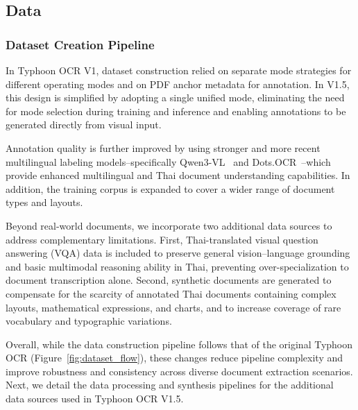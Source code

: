 \documentclass[]{typhoon} %
\begin{document}


\subsection{Data}
\subsubsection{Dataset Creation Pipeline}

In Typhoon OCR V1, dataset construction relied on separate mode strategies for different operating modes and on PDF anchor metadata for annotation. In V1.5, this design is simplified by adopting a single unified mode, eliminating the need for mode selection during training and inference and enabling annotations to be generated directly from visual input.

Annotation quality is further improved by using stronger and more recent multilingual labeling models--specifically Qwen3-VL~\citep{bai2025qwen3vltechnicalreport} and Dots.OCR~\citep{li2025dotsocrmultilingualdocumentlayout}--which provide enhanced multilingual and Thai document understanding capabilities. In addition, the training corpus is expanded to cover a wider range of document types and layouts.

Beyond real-world documents, we incorporate two additional data sources to address complementary limitations. First, Thai-translated visual question answering (VQA) data is included to preserve general vision--language grounding and basic multimodal reasoning ability in Thai, preventing over-specialization to document transcription alone. Second, synthetic documents are generated to compensate for the scarcity of annotated Thai documents containing complex layouts, mathematical expressions, and charts, and to increase coverage of rare vocabulary and typographic variations.

Overall, while the data construction pipeline follows that of the original Typhoon OCR (Figure~\ref{fig:dataset_flow}), these changes reduce pipeline complexity and improve robustness and consistency across diverse document extraction scenarios. Next, we detail the data processing and synthesis pipelines for the additional data sources used in Typhoon OCR V1.5.
\end{document}

